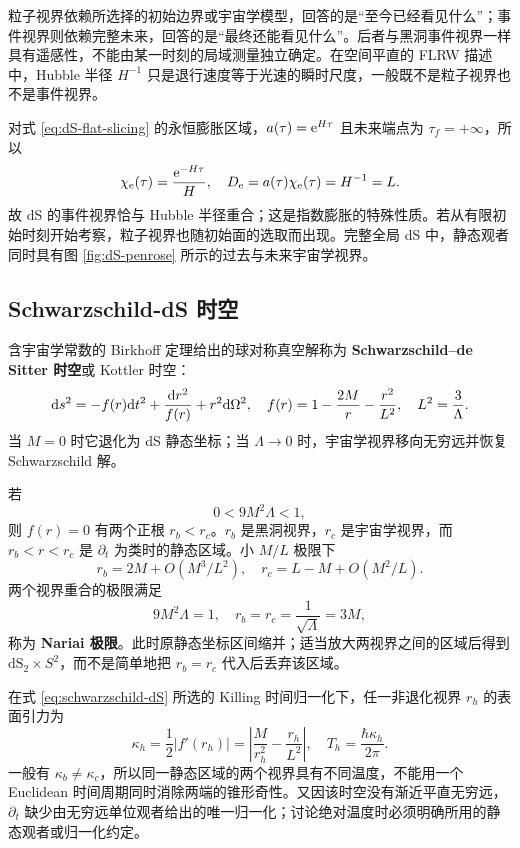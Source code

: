 粒子视界依赖所选择的初始边界或宇宙学模型，回答的是“至今已经看见什么”；事件视界则依赖完整未来，回答的是“最终还能看见什么”。后者与黑洞事件视界一样具有遥感性，不能由某一时刻的局域测量独立确定。在空间平直的 FLRW 描述中，Hubble 半径 $H^{-1}$ 只是退行速度等于光速的瞬时尺度，一般既不是粒子视界也不是事件视界。

对式 \eqref{eq:dS-flat-slicing} 的永恒膨胀区域，$a(\tau)=\mathrm{e}^{H\tau}$ 且未来端点为 $\tau_f=+\infty$，所以
\[
    \chi_{\rm e}(\tau)=\frac{\mathrm{e}^{-H\tau}}{H},
    \quad D_{\rm e}=a(\tau)\chi_{\rm e}(\tau)=H^{-1}=L.
\]
故 dS 的事件视界恰与 Hubble 半径重合；这是指数膨胀的特殊性质。若从有限初始时刻开始考察，粒子视界也随初始面的选取而出现。完整全局 dS 中，静态观者同时具有图 \ref{fig:dS-penrose} 所示的过去与未来宇宙学视界。

\subsection{Schwarzschild-dS 时空}

含宇宙学常数的 Birkhoff 定理给出的球对称真空解称为 \textbf{Schwarzschild--de Sitter 时空}或 Kottler 时空：
\begin{equation}\label{eq:schwarzschild-dS}
    \dd s^2=-f(r)\dd t^2+\frac{\dd r^2}{f(r)}+r^2\dd\Omega^2,
    \quad
    f(r)=1-\frac{2M}{r}-\frac{r^2}{L^2},
    \quad L^2=\frac3\Lambda.
\end{equation}
当 $M=0$ 时它退化为 dS 静态坐标；当 $\Lambda\to0$ 时，宇宙学视界移向无穷远并恢复 Schwarzschild 解。

若
\begin{equation}
    0<9M^2\Lambda<1,
\end{equation}
则 $f(r)=0$ 有两个正根 $r_b<r_c$。$r_b$ 是黑洞视界，$r_c$ 是宇宙学视界，而 $r_b<r<r_c$ 是 $\partial_t$ 为类时的静态区域。小 $M/L$ 极限下
\[
    r_b=2M+O(M^3/L^2),\quad
    r_c=L-M+O(M^2/L).
\]
两个视界重合的极限满足
\[
    9M^2\Lambda=1,\quad r_b=r_c=\frac1{\sqrt\Lambda}=3M,
\]
称为 \textbf{Nariai 极限}。此时原静态坐标区间缩并；适当放大两视界之间的区域后得到 $\mathrm{dS}_2\times S^2$，而不是简单地把 $r_b=r_c$ 代入后丢弃该区域。

在式 \eqref{eq:schwarzschild-dS} 所选的 Killing 时间归一化下，任一非退化视界 $r_h$ 的表面引力为
\begin{equation}
    \kappa_h=\frac12|f'(r_h)|
      =\left|\frac{M}{r_h^2}-\frac{r_h}{L^2}\right|,
    \quad T_h=\frac{\hbar\kappa_h}{2\pi}.
\end{equation}
一般有 $\kappa_b\ne\kappa_c$，所以同一静态区域的两个视界具有不同温度，不能用一个 Euclidean 时间周期同时消除两端的锥形奇性。又因该时空没有渐近平直无穷远，$\partial_t$ 缺少由无穷远单位观者给出的唯一归一化；讨论绝对温度时必须明确所用的静态观者或归一化约定。

